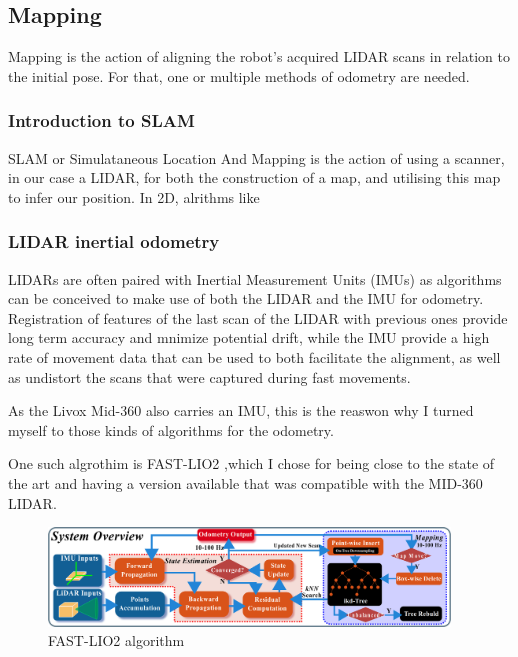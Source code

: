 \documentclass[11pt]{article}
\begin{document}
    \subsection{Mapping}

        Mapping is the action of aligning the robot's acquired LIDAR scans in relation to the initial pose. For that, one or multiple methods of odometry are needed. 
        \subsubsection{Introduction to SLAM}
        SLAM or Simulataneous Location And Mapping is the action of using a scanner, in our case a LIDAR, for both the construction of a map, and utilising this map to infer our position. In 2D, alrithms like 


        
        
        \subsubsection{LIDAR inertial odometry}

        LIDARs are often paired with Inertial Measurement Units (IMUs) as algorithms can be conceived to make use of both the LIDAR and the IMU for odometry. Registration of features of the last scan of the LIDAR with previous ones provide long term accuracy and mnimize potential drift, while the IMU provide a high rate of movement data that can be used to both facilitate the alignment, as well as undistort the scans that were captured during fast movements.


        As the Livox Mid-360 also carries an IMU, this is the reaswon why I turned myself to those kinds of algorithms for the odometry. 

        One such algrothim is FAST-LIO2 \cite{xu2022fast},which I chose for being close to the state of the art and having a version available that was compatible with the MID-360 LIDAR.


        \begin{figure}[h]
            \centering
            \includegraphics[width=0.95\textwidth]{Images/overview_fastlio2.png}
            \caption{FAST-LIO2 algorithm}
        \end{figure}
\end{document}
